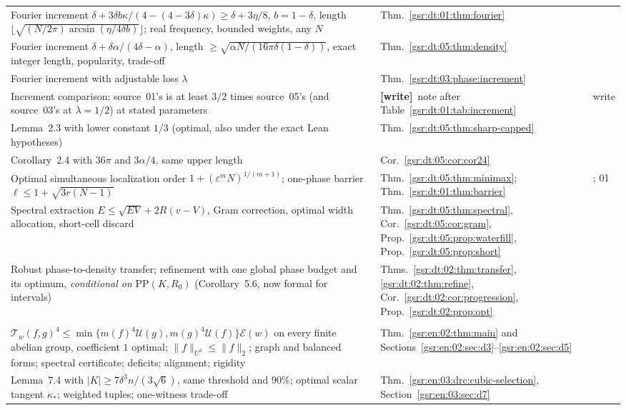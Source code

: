 \documentclass[11pt,letterpaper]{article}
\numberwithin{equation}{section}
\theoremstyle{definition}
\theoremstyle{remark}
\newcommand{\1}{\mathbf 1}
\newcommand{\U}{\mathcal U}
\newcommand{\calE}{\mathcal E}
\newcommand{\calT}{\mathcal T}
\newcommand{\wtag}{\textup{\textbf{[write]}}}
\begin{document}
\begin{longtable}{@{}>{\raggedright\arraybackslash}p{} >{\raggedright\arraybackslash}p{} >{\raggedright\arraybackslash}p{}@{}}
Fourier increment $\delta+3\delta b\kappa/(4-(4-3\delta)\kappa)\ge\delta+3\eta/8$, $b=1-\delta$, length $\lfloor\sqrt{(N/2\pi)\arcsin(\eta/4\delta b)}\rfloor$; real frequency, bounded weights, any $N$ & Thm.~\ref{gsr:dt:01:thm:fourier} & 01\\
Fourier increment $\delta+\delta\alpha/(4\delta-\alpha)$, length $\ge\sqrt{\alpha N/(16\pi\delta(1-\delta))}$, exact integer length, popularity, trade-off & Thm.~\ref{gsr:dt:05:thm:density} & 05\\
Fourier increment with adjustable loss $\lambda$ & Thm.~\ref{gsr:dt:03:phase:increment} & 03\\
Increment comparison: source~01's is at least $3/2$ times source~05's (and source~03's at $\lambda=1/2$) at stated parameters & \wtag\ note after Table~\ref{gsr:dt:01:tab:increment} & write\\
Lemma~2.3 with lower constant $1/3$ (optimal, also under the exact Lean hypotheses) & Thm.~\ref{gsr:dt:05:thm:sharp-capped} & 05\\
Corollary~2.4 with $36\pi$ and $3\alpha/4$, same upper length & Cor.~\ref{gsr:dt:05:cor:cor24} & 05\\
Optimal simultaneous localization order $1+(\varepsilon^mN)^{1/(m+1)}$; one-phase barrier $\ell\le1+\sqrt{3r(N-1)}$ & Thm.~\ref{gsr:dt:05:thm:minimax}; Thm.~\ref{gsr:dt:01:thm:barrier} & 05; 01\\
Spectral extraction $E\le\sqrt{EV}+2R(v-V)$, Gram correction, optimal width allocation, short-cell discard & Thm.~\ref{gsr:dt:05:thm:spectral}, Cor.~\ref{gsr:dt:05:cor:gram}, Prop.~\ref{gsr:dt:05:prop:waterfill}, Prop.~\ref{gsr:dt:05:prop:short} & 05\\
Robust phase-to-density transfer; refinement with one global phase budget and its optimum, \emph{conditional on} $\mathrm{PP}(K,R_0)$ (Corollary~5.6, now formal for intervals) & Thms.~\ref{gsr:dt:02:thm:transfer}, \ref{gsr:dt:02:thm:refine}, Cor.~\ref{gsr:dt:02:cor:progression}, Prop.~\ref{gsr:dt:02:prop:opt} & 02\\
\midrule
\multicolumn{3}{@{}l}{\emph{Part II. The inverse step}}\\
$\calT_w(f,g)^4\le\min\{m(f)^4\U(g),m(g)^4\U(f)\}\calE(w)$ on every finite abelian group, coefficient $1$ optimal; $\|f\|_{U^3}\le\|f\|_2$; graph and balanced forms; spectral certificate; deficits; alignment; rigidity & Thm.~\ref{gsr:en:02:thm:main} and Sections~\ref{gsr:en:02:sec:d3}--\ref{gsr:en:02:sec:d5} & 02\\
Lemma~7.4 with $|K|\ge7\delta^3n/(3\sqrt6)$, same threshold and $90\%$; optimal scalar tangent $\kappa_*$; weighted tuples; one-witness trade-off & Thm.~\ref{gsr:en:03:drc:cubic-selection}, Section~\ref{gsr:en:03:sec:d7} & 03\\

\end{longtable}
\end{document}
